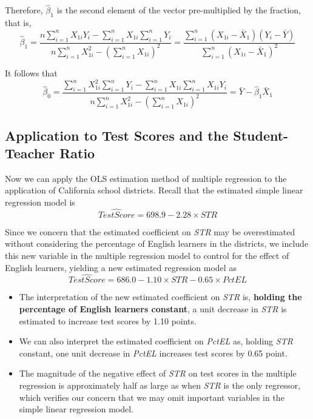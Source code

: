\documentclass[a4paper,11pt]{article}
\begin{document}
Therefore, \(\hat{\beta}_1\) is the second element of the vector
pre-multiplied by the fraction, that is,
\begin{equation*}
\hat{\beta}_1 = \frac{n \sum_{i=1}^n X_{1i} Y_i - \sum_{i=1}^n X_{1i} \sum_{i=1}^n Y_i}{n \sum_{i=1}^n X_{1i}^2 - (\sum_{i=1}^n X_{1i})^2} = \frac{\sum_{i=1}^n (X_{1i} - \bar{X}_1)(Y_i - \bar{Y})}{\sum_{i=1}^n (X_{1i} - \bar{X}_1)^2}
\end{equation*}

It follows that
\begin{equation*}
\hat{\beta}_0 = \frac{\sum_{i=1}^n X_{1i}^2 \sum_{i=1}^n Y_i - \sum_{i=1}^n X_{1i} \sum_{i=1}^n X_{1i}Y_i}{n \sum_{i=1}^n X_{1i}^2 - (\sum_{i=1}^n X_{1i})^2} = \bar{Y} - \hat{\beta}_1 \bar{X}_1
\end{equation*}

\subsection{Application to Test Scores and the Student-Teacher Ratio}
\label{sec:org8e0b090}
Now we can apply the OLS estimation method of multiple regression to
the application of California school districts. Recall that the
estimated simple linear regression model is
\[ \widehat{TestScore} = 698.9 - 2.28 \times STR \]

Since we concern that the estimated coefficient on \emph{STR} may be
overestimated without considering the percentage of English
learners in the districts, we include this new variable in the
multiple regression model to control for the effect of English
learners, yielding a new estimated regression model as
\[ \widehat{TestScore} = 686.0 - 1.10 \times STR - 0.65 \times PctEL
\]
\begin{itemize}
\item The interpretation of the new estimated coefficient on \emph{STR} is,
\textbf{holding the percentage of English learners constant}, a unit
decrease in \emph{STR} is estimated to increase test scores by 1.10
points.
\item We can also interpret the estimated coefficient on \emph{PctEL} as,
holding \emph{STR} constant, one unit decrease in \emph{PctEL} increases test
scores by 0.65 point.
\item The magnitude of the negative effect of \emph{STR} on test scores in the
multiple regression is approximately half as large as when \emph{STR} is
the only regressor, which verifies our concern that we may omit
important variables in the simple linear regression model.
\end{itemize}
\end{document}
